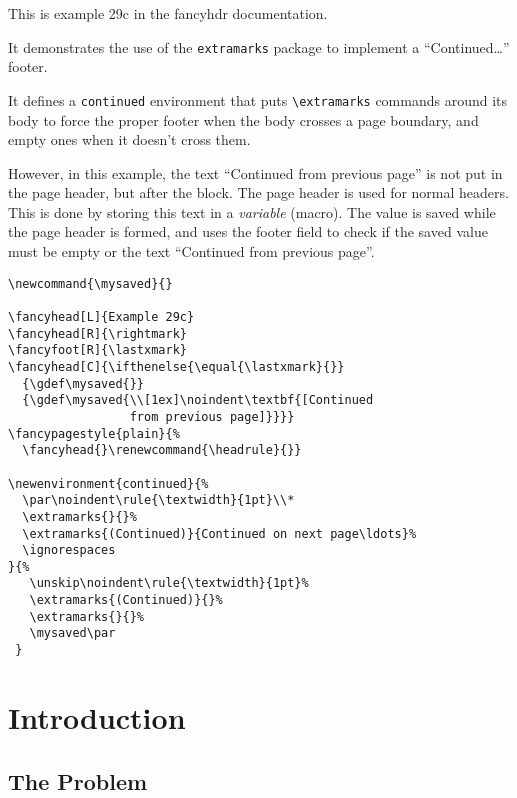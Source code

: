 \documentclass{report}
\newcommand{\mysaved}{}
\begin{document}
\tableofcontents

\thispagestyle{plain}
\noindent
\begin{boxedminipage}{\textwidth}
This is example 29c in the fancyhdr documentation.

It demonstrates the use of the \texttt{extramarks} package to implement
a ``Continued\ldots'' footer.

It defines a \texttt{continued} environment that puts \verb|\extramarks| commands around its body to force the proper footer when the body crosses a page boundary, and empty ones when it doesn't cross them.

However, in this example, the text ``Continued from previous page'' is not put in the page header, but after the block. The page header is used for normal headers. This is done by storing this text in a \emph{variable} (macro). The value is saved while the page header is formed, and uses the footer field to check if the saved value must be empty or the text ``Continued from previous page''.

\begin{verbatim}
\newcommand{\mysaved}{}

\fancyhead[L]{Example 29c}
\fancyhead[R]{\rightmark}
\fancyfoot[R]{\lastxmark}
\fancyhead[C]{\ifthenelse{\equal{\lastxmark}{}}
  {\gdef\mysaved{}}
  {\gdef\mysaved{\\[1ex]\noindent\textbf{[Continued
                 from previous page]}}}}
\fancypagestyle{plain}{%
  \fancyhead{}\renewcommand{\headrule}{}}

\newenvironment{continued}{%
  \par\noindent\rule{\textwidth}{1pt}\\*
  \extramarks{}{}%
  \extramarks{(Continued)}{Continued on next page\ldots}%
  \ignorespaces
}{%
   \unskip\noindent\rule{\textwidth}{1pt}%
   \extramarks{(Continued)}{}%
   \extramarks{}{}%
   \mysaved\par
 }
\end{verbatim}

\end{boxedminipage}

\pagestyle{fancy}

\newpage
{}
\chapter{Introduction}

\lipsum[1-4]

\section{The Problem}
\label{sec:problem}
\end{document}
